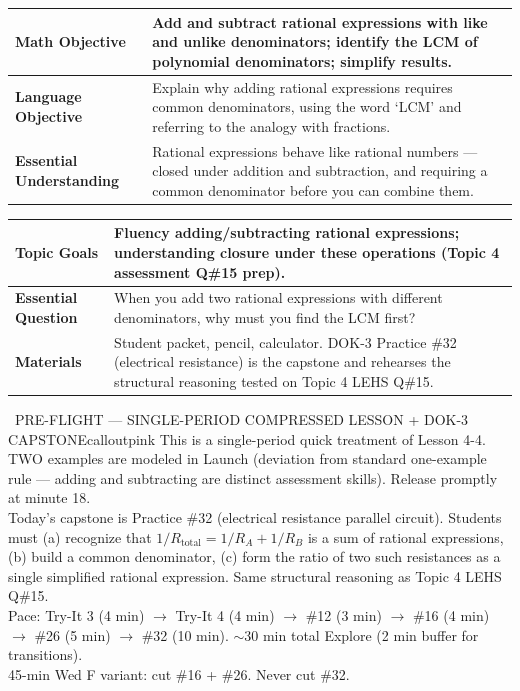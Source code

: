 \documentclass[11pt]{article}
\begin{document}

{\small
\renewcommand{\arraystretch}{1.25}
\noindent\begin{tabular}{|p{1.8in}|p{4.8in}|}
\hline
\textbf{Math Objective} & Add and subtract rational expressions with like and unlike denominators; identify the LCM of polynomial denominators; simplify results. \\ \hline
\textbf{Language Objective} & Explain why adding rational expressions requires common denominators, using the word `LCM' and referring to the analogy with fractions. \\ \hline
\textbf{Essential Understanding} & Rational expressions behave like rational numbers --- closed under addition and subtraction, and requiring a common denominator before you can combine them. \\ \hline
\end{tabular}
}

{\small
\renewcommand{\arraystretch}{1.25}
\noindent\begin{tabular}{|p{1.8in}|p{4.8in}|}
\hline
\textbf{Topic Goals} & Fluency adding/subtracting rational expressions; understanding closure under these operations (Topic 4 assessment Q\#15 prep). \\ \hline
\textbf{Essential Question} & When you add two rational expressions with different denominators, why must you find the LCM first? \\ \hline
\textbf{Materials} & Student packet, pencil, calculator. DOK-3 Practice \#32 (electrical resistance) is the capstone and rehearses the structural reasoning tested on Topic 4 LEHS Q\#15. \\ \hline
\end{tabular}
}

\begin{callout}{\IconPin\ PRE-FLIGHT --- SINGLE-PERIOD COMPRESSED LESSON + DOK-3 CAPSTONE}{calloutpink}
This is a single-period quick treatment of Lesson 4-4. TWO examples are modeled in Launch (deviation from standard one-example rule --- adding and subtracting are distinct assessment skills). Release promptly at minute 18.\\
Today's capstone is Practice \#32 (electrical resistance parallel circuit). Students must (a) recognize that \(1/R_{\text{total}} = 1/R_A + 1/R_B\) is a sum of rational expressions, (b) build a common denominator, (c) form the ratio of two such resistances as a single simplified rational expression. Same structural reasoning as Topic 4 LEHS Q\#15.\\
Pace: Try-It 3 (4 min) \(\rightarrow\) Try-It 4 (4 min) \(\rightarrow\) \#12 (3 min) \(\rightarrow\) \#16 (4 min) \(\rightarrow\) \#26 (5 min) \(\rightarrow\) \#32 (10 min). \(\sim\)30 min total Explore (2 min buffer for transitions).\\
45-min Wed F variant: cut \#16 + \#26. Never cut \#32.
\end{callout}
\end{document}

